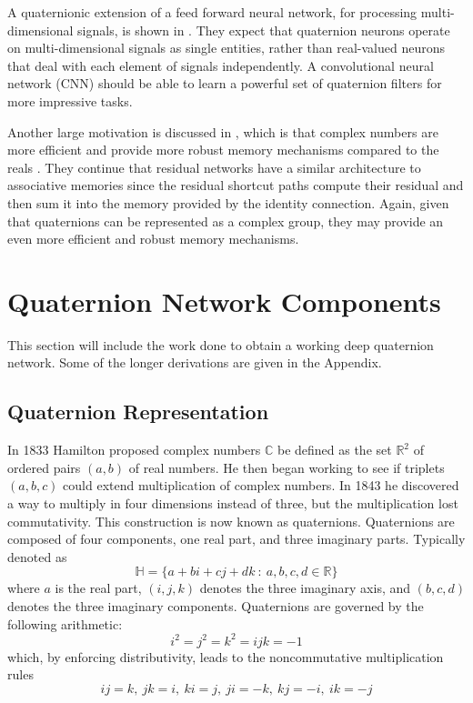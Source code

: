 \documentclass[conference]{IEEEtran}
\begin{document}
A quaternionic extension of a feed forward neural network, for processing multi-dimensional signals, is shown in \cite{minemoto2017feed}.
They expect that quaternion neurons operate on multi-dimensional signals as single entities, rather than real-valued neurons that deal with each element of signals independently.
A convolutional neural network (CNN) should be able to learn a powerful set of quaternion filters for more impressive tasks.

Another large motivation is discussed in \cite{trabelsi2017deep}, which is that complex numbers are more efficient and provide more robust memory mechanisms compared to the reals \cite{bulow1999hypercomplex, sangwine2000colour, bulow2001hypercomplex}.
They continue that residual networks have a similar architecture to associative memories since the residual shortcut paths compute their residual and then sum it into the memory provided by the identity connection.
Again, given that quaternions can be represented as a complex group, they may provide an even more efficient and robust memory mechanisms.


\section{Quaternion Network Components}
This section will include the work done to obtain a working deep quaternion network. 
Some of the longer derivations are given in the Appendix.

\subsection{Quaternion Representation}
In 1833 Hamilton proposed complex numbers $\mathbb{C}$ be defined as the set $\mathbb{R}^2$ of ordered pairs $(a, b)$ of real numbers.
He then began working to see if triplets $(a,b,c)$ could extend multiplication of complex numbers.
In 1843 he discovered a way to multiply in four dimensions instead of three, but the multiplication lost commutativity.
This construction is now known as quaternions.
Quaternions are composed of four components, one real part, and three imaginary parts.
Typically denoted as
\begin{equation}
\mathbb{H} = \{a + b\textit{i} + c\textit{j} + d\textit{k}~:~a,b,c,d \in \mathbb{R}\}
\label{eq:quaternion1}
\end{equation}
where $a$ is the real part, $(i,j,k)$ denotes the three imaginary axis, and $(b,c,d)$ denotes the three imaginary components.
Quaternions are governed by the following arithmetic:
\begin{equation}
i^2=j^2=k^2=ijk=-1
\label{eq:quarternion2}
\end{equation}
which, by enforcing distributivity, leads to the noncommutative multiplication rules
\begin{equation}
ij=k,~jk=i,~ki=j,~ji=-k,~kj=-i,~ik=-j
\label{eq:quarternion3}
\end{equation}
\end{document}
